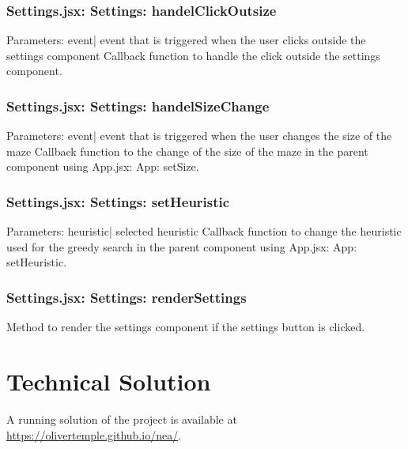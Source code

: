 \documentclass[titlepage]{article}
\begin{document}
\subsubsection{Settings.jsx: Settings: handelClickOutsize}
Parameters:\newline
\indent event| event that is triggered when the user clicks outside the settings component\newline
Callback function to handle the click outside the settings component.

\subsubsection{Settings.jsx: Settings: handelSizeChange}
Parameters:\newline
\indent event| event that is triggered when the user changes the size of the maze\newline
Callback function to the change of the size of the maze in the parent component using App.jsx: App: setSize.

\subsubsection{Settings.jsx: Settings: setHeuristic}
Parameters:\newline
\indent heuristic| selected heuristic\newline
Callback function to change the heuristic used for the greedy search in the parent component using App.jsx: App: setHeuristic.

\subsubsection{Settings.jsx: Settings: renderSettings}
Method to render the settings component if the settings button is clicked.

\section{Technical Solution}
A running solution of the project is available at \url{https://olivertemple.github.io/nea/}.
\end{document}
